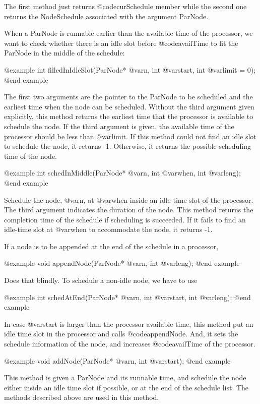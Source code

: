 The first method just returns @code{curSchedule} member while the second one
returns the NodeSchedule associated with the argument ParNode.

When a ParNode is runnable earlier than the available time of the processor,
we want to check whether there is an idle slot before @code{availTime} to
fit the ParNode in the middle of the schedule:

@example
int filledInIdleSlot(ParNode* @var{n}, int @var{start}, int @var{limit} = 0);
@end example

The first two arguments are the pointer to the ParNode to be scheduled and
the earliest time when the node can be scheduled. Without the third argument
given explicitly, this method returns the earliest time that the processor
is available to schedule the node. If the third argument is given,
the available time of the processor should be less than @var{limit}.
If this method could not find an idle slot to schedule the node, it returns
-1. Otherwise, it returns the possible scheduling time of the node.

@example
int schedInMiddle(ParNode* @var{n}, int @var{when}, int @var{leng});
@end example

Schedule the node, @var{n}, at @var{when} inside an idle-time slot of the
processor. The third argument indicates the duration of the node.
This method returns the completion time of the schedule if scheduling
is succeeded. If it fails to find an idle-time slot at @var{when} to
accommodate the node, it returns -1.

If a node is to be appended at the end of the schedule in a processor,

@example
void appendNode(ParNode* @var{n}, int @var{leng});
@end example

Does that blindly. To schedule a non-idle node, we have to use

@example
int schedAtEnd(ParNode* @var{n}, int @var{start}, int @var{leng});
@end example

In case @var{start} is larger than the processor available time, this
method put an idle time slot in the processor and calls @code{appendNode}.
And, it sets the schedule information of the node, and increases
@code{availTime} of the processor.

@example
void addNode(ParNode* @var{n}, int @var{start});
@end example

This method is given a ParNode and its runnable time, and schedule the node
either inside an idle time slot if possible, or at the end of the schedule
list. The methods described above are used in this method.


